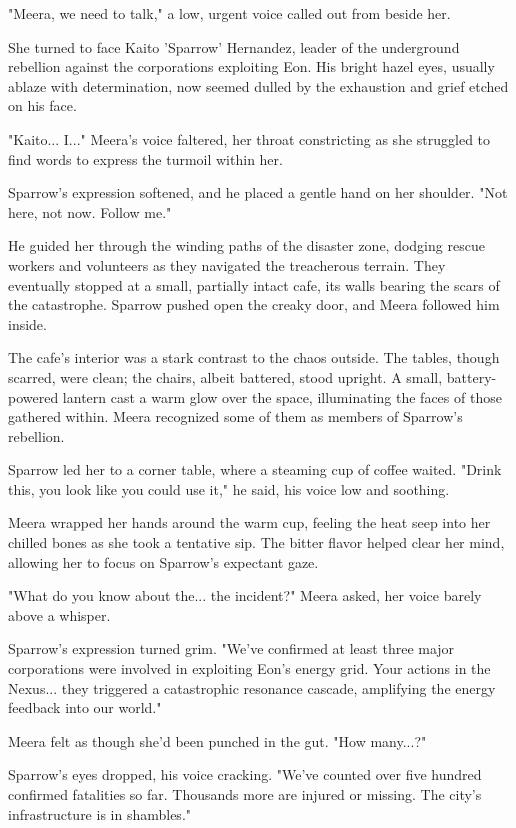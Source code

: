 \documentclass[12pt]{report}  %
\begin{document}
"Meera, we need to talk," a low, urgent voice called out from beside
her.

She turned to face Kaito 'Sparrow' Hernandez, leader of the underground
rebellion against the corporations exploiting Eon. His bright hazel
eyes, usually ablaze with determination, now seemed dulled by the
exhaustion and grief etched on his face.

"Kaito... I..." Meera's voice faltered, her throat constricting as she
struggled to find words to express the turmoil within her.

Sparrow's expression softened, and he placed a gentle hand on her
shoulder. "Not here, not now. Follow me."

He guided her through the winding paths of the disaster zone, dodging
rescue workers and volunteers as they navigated the treacherous terrain.
They eventually stopped at a small, partially intact cafe, its walls
bearing the scars of the catastrophe. Sparrow pushed open the creaky
door, and Meera followed him inside.

The cafe's interior was a stark contrast to the chaos outside. The
tables, though scarred, were clean; the chairs, albeit battered, stood
upright. A small, battery-powered lantern cast a warm glow over the
space, illuminating the faces of those gathered within. Meera recognized
some of them as members of Sparrow's rebellion.

Sparrow led her to a corner table, where a steaming cup of coffee
waited. "Drink this, you look like you could use it," he said, his voice
low and soothing.

Meera wrapped her hands around the warm cup, feeling the heat seep into
her chilled bones as she took a tentative sip. The bitter flavor helped
clear her mind, allowing her to focus on Sparrow's expectant gaze.

"What do you know about the... the incident?" Meera asked, her voice
barely above a whisper.

Sparrow's expression turned grim. "We've confirmed at least three major
corporations were involved in exploiting Eon's energy grid. Your actions
in the Nexus... they triggered a catastrophic resonance cascade,
amplifying the energy feedback into our world."

Meera felt as though she'd been punched in the gut. "How many...?"

Sparrow's eyes dropped, his voice cracking. "We've counted over five
hundred confirmed fatalities so far. Thousands more are injured or
missing. The city's infrastructure is in shambles."
\end{document}
